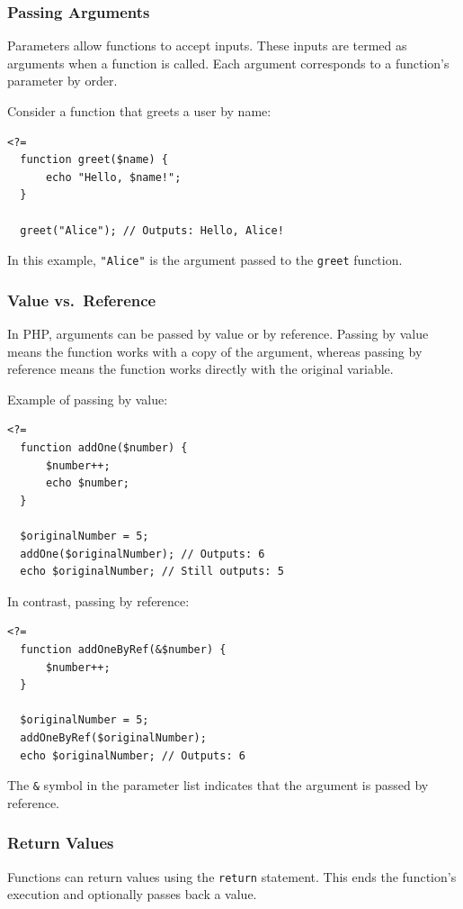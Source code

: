 \documentclass[11pt]{article}
\begin{document}
\subsubsection{Passing Arguments}
\label{sec:org3af60d5}
Parameters allow functions to accept inputs. These inputs are termed as
arguments when a function is called. Each argument corresponds to a
function's parameter by order.

Consider a function that greets a user by name:

\begin{verbatim}
<?=
  function greet($name) {
      echo "Hello, $name!";
  }

  greet("Alice"); // Outputs: Hello, Alice!
\end{verbatim}

In this example, \texttt{"Alice"} is the argument passed to the \texttt{greet}
function.

\subsubsection{Value vs. Reference}
\label{sec:org5b35754}
In PHP, arguments can be passed by value or by reference. Passing by
value means the function works with a copy of the argument, whereas
passing by reference means the function works directly with the original
variable.

Example of passing by value:

\begin{verbatim}
<?=
  function addOne($number) {
      $number++;
      echo $number;
  }

  $originalNumber = 5;
  addOne($originalNumber); // Outputs: 6
  echo $originalNumber; // Still outputs: 5
\end{verbatim}

In contrast, passing by reference:

\begin{verbatim}
<?=
  function addOneByRef(&$number) {
      $number++;
  }

  $originalNumber = 5;
  addOneByRef($originalNumber);
  echo $originalNumber; // Outputs: 6
\end{verbatim}

The \texttt{\&} symbol in the parameter list indicates that the argument is
passed by reference.

\subsubsection{Return Values}
\label{sec:org0bfbf26}
Functions can return values using the \texttt{return} statement. This ends the
function's execution and optionally passes back a value.
\end{document}
